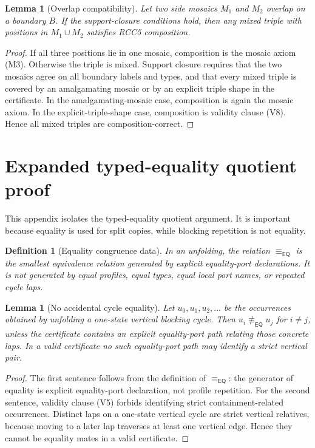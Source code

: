 \documentclass[11pt]{article}
\newtheorem{lemma}[theorem]{Lemma}
\newtheorem{definition}[theorem]{Definition}
\newcommand{\EQ}{\mathsf{EQ}}
\newcommand{\eqc}{\equiv_{\EQ}}
\begin{document}
\begin{lemma}[Overlap compatibility]
Let two side mosaics $M_1$ and $M_2$ overlap on a boundary $B$.  If the support-closure conditions hold, then any mixed triple with positions in $M_1\cup M_2$ satisfies RCC5 composition.
\end{lemma}

\begin{proof}
If all three positions lie in one mosaic, composition is the mosaic axiom (M3).  Otherwise the triple is mixed.  Support closure requires that the two mosaics agree on all boundary labels and types, and that every mixed triple is covered by an amalgamating mosaic or by an explicit triple shape in the certificate.  In the amalgamating-mosaic case, composition is again the mosaic axiom.  In the explicit-triple-shape case, composition is validity clause (V8).  Hence all mixed triples are composition-correct.
\end{proof}

\section{Expanded typed-equality quotient proof}

This appendix isolates the typed-equality quotient argument.  It is important because equality is used for split copies, while blocking repetition is not equality.

\begin{definition}[Equality congruence data]
In an unfolding, the relation $\eqc$ is the smallest equivalence relation generated by explicit equality-port declarations.  It is not generated by equal profiles, equal types, equal local port names, or repeated cycle laps.
\end{definition}

\begin{lemma}[No accidental cycle equality]
Let $u_0,u_1,u_2,\ldots$ be the occurrences obtained by unfolding a one-state vertical blocking cycle.  Then $u_i\not\eqc u_j$ for $i\ne j$, unless the certificate contains an explicit equality-port path relating those concrete laps.  In a valid certificate no such equality-port path may identify a strict vertical pair.
\end{lemma}

\begin{proof}
The first sentence follows from the definition of $\eqc$: the generator of equality is explicit equality-port declaration, not profile repetition.  For the second sentence, validity clause (V5) forbids identifying strict containment-related occurrences.  Distinct laps on a one-state vertical cycle are strict vertical relatives, because moving to a later lap traverses at least one vertical edge.  Hence they cannot be equality mates in a valid certificate.
\end{proof}
\end{document}
